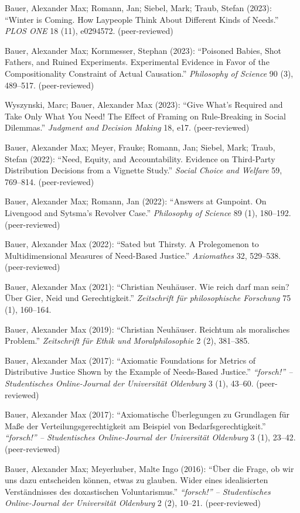 \documentclass[a4paper,10pt]{article}
\newenvironment{literature}{%
   \parskip6pt\parindent0pt\raggedright
   \def\lititem{\hangindent=1cm\hangafter1}}{%
   \par\ignorespaces}
\begin{document}
\begin{literature}
\lititem Bauer, Alexander Max; Romann, Jan; Siebel, Mark; Traub, Stefan (2023): \enquote{Winter is Coming. How Laypeople Think About Different Kinds of Needs.} \textit{PLOS ONE} 18 (11), e0294572. (peer-reviewed)

\lititem Bauer, Alexander Max; Kornmesser, Stephan (2023): \enquote{Poisoned Babies, Shot Fathers, and Ruined Experiments. Experimental Evidence in Favor of the Compositionality Constraint of Actual Causation.} \textit{Philosophy of Science} 90 (3), 489--517. (peer-reviewed)

\lititem Wyszynski, Marc; Bauer, Alexander Max (2023): \enquote{Give What's Required and Take Only What You Need! The Effect of Framing on Rule-Breaking in Social Dilemmas.} \textit{Judgment and Decision Making} 18, e17. (peer-reviewed)

\lititem Bauer, Alexander Max; Meyer, Frauke; Romann, Jan; Siebel, Mark; Traub, Stefan (2022): \enquote{Need, Equity, and Accountability. Evidence on Third-Party Distribution Decisions from a Vignette Study.} \textit{Social Choice and Welfare} 59, 769--814. (peer-reviewed)

\lititem Bauer, Alexander Max; Romann, Jan (2022): \enquote{Answers at Gunpoint. On Livengood and Sytsma's Revolver Case.} \textit{Philosophy of Science} 89 (1), 180--192. (peer-reviewed)

\lititem Bauer, Alexander Max (2022): \enquote{Sated but Thirsty. A Prolegomenon to Multidimensional Measures of Need-Based Justice.} \textit{Axiomathes} 32, 529--538. (peer-reviewed)

\lititem Bauer, Alexander Max (2021): \enquote{Christian Neuhäuser. Wie reich darf man sein? Über Gier, Neid und Gerechtigkeit.} \textit{Zeitschrift für philosophische Forschung} 75 (1), 160--164.

\lititem Bauer, Alexander Max (2019): \enquote{Christian Neuhäuser. Reichtum als moralisches Problem.} \textit{Zeitschrift für Ethik und Moralphilosophie} 2 (2), 381--385.

\lititem Bauer, Alexander Max (2017): \enquote{Axiomatic Foundations for Metrics of Distributive Justice Shown by the Example of Needs-Based Justice.} \textit{\enquote{forsch!} -- Studentisches Online-Journal der Universität Oldenburg} 3 (1), 43--60. (peer-reviewed)

\lititem Bauer, Alexander Max (2017): \enquote{Axiomatische Überlegungen zu Grundlagen für Maße der Verteilungsgerechtigkeit am Beispiel von Bedarfsgerechtigkeit.} \textit{\enquote{forsch!} -- Studentisches Online-Journal der Universität Oldenburg} 3 (1), 23--42. (peer-reviewed)

\lititem Bauer, Alexander Max; Meyerhuber, Malte Ingo (2016): \enquote{Über die Frage, ob wir uns dazu entscheiden können, etwas zu glauben. Wider eines idealisierten Verständnisses des doxastischen Voluntarismus.} \textit{\enquote{forsch!} -- Studentisches Online-Journal der Universität Oldenburg} 2 (2), 10--21. (peer-reviewed)
\end{literature}
\end{document}

